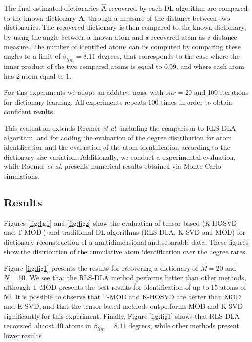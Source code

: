 The final estimated dictionaries $\hat{\textbf{A}}$ recovered by each DL algorithm are compared to the known dictionary $\textbf{A}$, through a measure of the distance between two dictionaries. The recovered dictionary is then compared to the known dictionary, by using the angle between a known atom and a recovered atom as a distance measure. The number of identified atoms can be computed by comparing these angles to a limit of $\beta_{lim} = 8.11$ degrees, that corresponds to the case where the inner product of the two compared atoms is equal to 0.99, and where each atom has 2-norm equal to 1.

For this experiments we adopt an additive noise with $snr = 20$ and 100 iterations for dictionary learning. All experiments repeats 100 times in order to obtain confident results.

This evaluation extends Roemer \emph{et al.} \cite{roemer2014tensor} including the comparison to RLS-DLA algorithm, and for adding the evaluation of the degree distribution for atom identification and the evaluation of the atom identification according to the dictionary size variation. Additionally, we conduct a experimental evaluation, while Roemer \emph{et al.} \cite{roemer2014tensor} presents numerical results obtained via Monte Carlo simulations.


\subsection{Results}
\label{sec:4_motivation_results}

Figures \ref{fig:fig1} and \ref{fig:fig2} show the evaluation of tensor-based (K-HOSVD \cite{roemer2014tensor} and T-MOD \cite{roemer2014tensor}) and traditional DL algorithms (RLS-DLA, K-SVD and MOD) for dictionary reconstruction of a multidimensional and separable data. These figures show the distribution of the cumulative atom identification over the degree rates.

Figure \ref{fig:fig1} presents the results for recovering a dictionary of $M=20$ and $N=50$. We see that the RLS-DLA method performs better than other methods, although T-MOD presents the best results for identification of up to 15 atoms of 50. It is possible to observe that T-MOD and K-HOSVD are better than MOD and K-SVD, and that the tensor-based methods outperforms MOD and K-SVD significantly for this experiment. Finally, Figure \ref{fig:fig1} shows that RLS-DLA recovered almost 40 atoms in $\beta_{lim} = 8.11$ degrees, while other methods present lower results.

